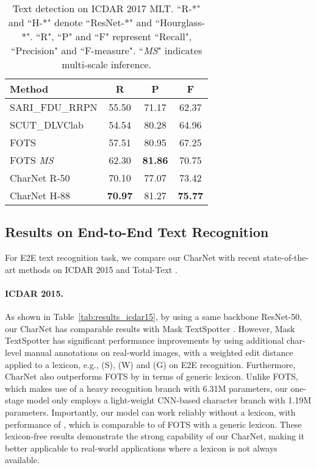 \documentclass[10pt,twocolumn,letterpaper]{article}
\begin{document}
\begin{table}[!h]
	\centering
	\begin{tabular}{l|c|c|c}
		\hline
		Method & R & P & F \\
		\hline
        SARI\_FDU\_RRPN \cite{ma2018arbitrary} & 55.50 & 71.17 & 62.37 \\
        SCUT\_DLVClab & 54.54 & 80.28 & 64.96 \\
        FOTS \cite{liu2018fots} & 57.51 & 80.95 & 67.25 \\
        FOTS \textit{MS} \cite{liu2018fots} & 62.30 & \textbf{81.86} & 70.75 \\
		\hline\hline
		CharNet R-50 & 70.10 & 77.07 & 73.42 \\
		CharNet H-88 & \textbf{70.97} & 81.27 & \textbf{75.77} \\
		\hline
	\end{tabular}
	\vspace{-2mm}
	\caption{Text detection on ICDAR 2017 MLT. ``R-*" and ``H-*" denote ``ResNet-*" and ``Hourglass-*".  ``R", ``P" and ``F" represent ``Recall", ``Precision" and ``F-measure". ``\textit{MS}" indicates multi-scale inference.}
	\label{tab:mlt17_results}
\end{table}





\subsection{Results on End-to-End Text Recognition}
For E2E text recognition task, we compare our CharNet with recent state-of-the-art methods on ICDAR 2015 \cite{karatzas2015icdar} and Total-Text \cite{ch2017total}.


\paragraph{ICDAR 2015.} As shown in Table~\ref{tab:results_icdar15}, by using a same backbone ResNet-50, our CharNet has comparable results with Mask TextSpotter \cite{lyu2018mask}. However, Mask TextSpotter has significant performance improvements by using additional char-level manual annotations on real-world images, with a weighted edit distance applied to a lexicon, e.g.,  (S),  (W) and  (G) on E2E recognition. Furthermore, CharNet also outperforms FOTS by  in terms of generic lexicon. Unlike FOTS, which makes use of a heavy recognition branch with 6.31M parameters, our one-stage model only employs a light-weight CNN-based character branch with 1.19M parameters. Importantly, our model can work reliably without a lexicon, with performance of , which is comparable to  of FOTS with a generic lexicon. These lexicon-free results demonstrate the strong capability of our CharNet, making it better applicable to real-world applications where a lexicon is not always available.
\end{document}
